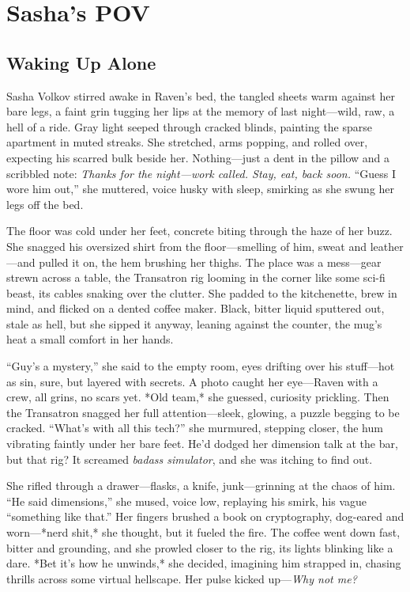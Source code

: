 \documentclass[12pt]{book}
\begin{document}
\chapter{Sasha’s POV}

\section{Waking Up Alone}

Sasha Volkov stirred awake in Raven’s bed, the tangled sheets warm against her bare legs, a faint grin tugging her lips at the memory of last night—wild, raw, a hell of a ride. Gray light seeped through cracked blinds, painting the sparse apartment in muted streaks. She stretched, arms popping, and rolled over, expecting his scarred bulk beside her. Nothing—just a dent in the pillow and a scribbled note: \textit{Thanks for the night—work called. Stay, eat, back soon.} “Guess I wore him out,” she muttered, voice husky with sleep, smirking as she swung her legs off the bed.

The floor was cold under her feet, concrete biting through the haze of her buzz. She snagged his oversized shirt from the floor—smelling of him, sweat and leather—and pulled it on, the hem brushing her thighs. The place was a mess—gear strewn across a table, the Transatron rig looming in the corner like some sci-fi beast, its cables snaking over the clutter. She padded to the kitchenette, brew in mind, and flicked on a dented coffee maker. Black, bitter liquid sputtered out, stale as hell, but she sipped it anyway, leaning against the counter, the mug’s heat a small comfort in her hands.

“Guy’s a mystery,” she said to the empty room, eyes drifting over his stuff—hot as sin, sure, but layered with secrets. A photo caught her eye—Raven with a crew, all grins, no scars yet. *Old team,* she guessed, curiosity prickling. Then the Transatron snagged her full attention—sleek, glowing, a puzzle begging to be cracked. “What’s with all this tech?” she murmured, stepping closer, the hum vibrating faintly under her bare feet. He’d dodged her dimension talk at the bar, but that rig? It screamed \textit{badass simulator}, and she was itching to find out.

She rifled through a drawer—flasks, a knife, junk—grinning at the chaos of him. “He said dimensions,” she mused, voice low, replaying his smirk, his vague “something like that.” Her fingers brushed a book on cryptography, dog-eared and worn—*nerd shit,* she thought, but it fueled the fire. The coffee went down fast, bitter and grounding, and she prowled closer to the rig, its lights blinking like a dare. *Bet it’s how he unwinds,* she decided, imagining him strapped in, chasing thrills across some virtual hellscape. Her pulse kicked up—\textit{Why not me?}
\end{document}
